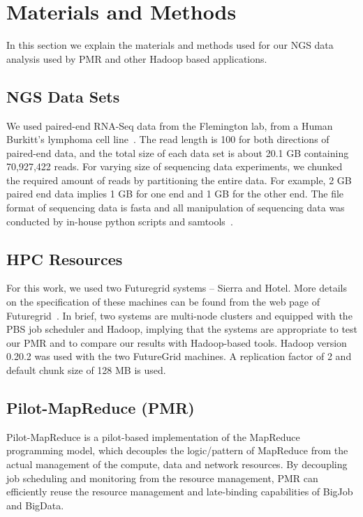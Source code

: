 \documentclass{acm_proc_article-sp}
\begin{document}
\section{Materials and Methods}\label{sec:materials_and_methods} 

In this section we explain the materials and methods used for our NGS data analysis used by PMR and other Hadoop based applications.

\subsection{NGS Data Sets}
We used paired-end RNA-Seq data from the Flemington lab, from a Human
Burkitt's lymphoma cell line~\cite{erik_2010}. The read length is 100
for both directions of paired-end data, and the total size of each
data set is about 20.1 GB containing 70,927,422 reads.  For varying
size of sequencing data experiments, we chunked the required amount of
reads by partitioning the entire data.  For example, 2 GB paired end
data implies 1 GB for one end and 1 GB for the other end.  The file
format of sequencing data is fasta and all manipulation of sequencing
data was conducted by in-house python scripts and
samtools~\cite{samtools}.

\subsection{HPC Resources}

For this work, we used two Futuregrid systems -- Sierra and Hotel.
More details on the specification of these machines can be found from
the web page of Futuregrid~\cite{futuregrid_url}.  In brief, two
systems are multi-node clusters and equipped with the PBS job
scheduler and Hadoop, implying that the systems are appropriate to
test our PMR and to compare our results with Hadoop-based
tools. Hadoop version 0.20.2 was used with the two FutureGrid
machines. A replication factor of 2 and default chunk size of 128 MB
is used.

\subsection{Pilot-MapReduce (PMR)}

Pilot-MapReduce is a pilot-based implementation of the MapReduce
programming model, which decouples the logic/pattern of MapReduce from
the actual management of the compute, data and network resources. By
decoupling job scheduling and monitoring from the resource management,
PMR can efficiently reuse the resource management and late-binding
capabilities of BigJob and BigData.
\end{document}
